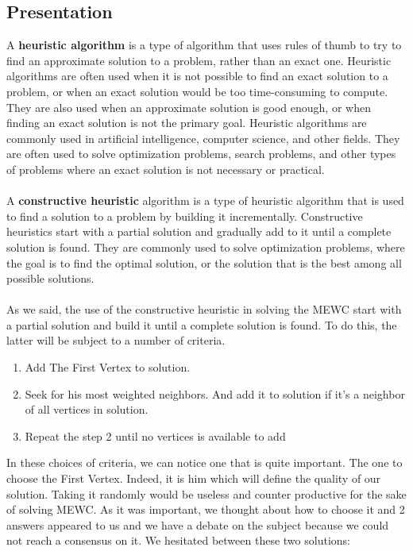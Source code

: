 
\subsection{Presentation}

    A \textbf{heuristic algorithm} is a type of algorithm that uses rules of thumb to try to find an approximate solution to a problem, rather than an exact one. Heuristic algorithms are often used when it is not possible to find an exact solution to a problem, or when an exact solution would be too time-consuming to compute. They are also used when an approximate solution is good enough, or when finding an exact solution is not the primary goal. Heuristic algorithms are commonly used in artificial intelligence, computer science, and other fields. They are often used to solve optimization problems, search problems, and other types of problems where an exact solution is not necessary or practical.
    \\ \\
    A \textbf{constructive heuristic} algorithm is a type of heuristic algorithm that is used to find a solution to a problem by building it incrementally. Constructive heuristics start with a partial solution and gradually add to it until a complete solution is found. They are commonly used to solve optimization problems, where the goal is to find the optimal solution, or the solution that is the best among all possible solutions.
    \\ \\
    As we said, the use of the constructive heuristic in solving the MEWC start with a partial solution and build it until a complete solution is found. To do this, the latter will be subject to a number of criteria. 

    \begin{enumerate}
        \item Add The First Vertex to solution.
        \item Seek for his most weighted neighbors. And add it to solution if it's a neighbor of all vertices in solution.
        \item Repeat the step 2 until no vertices is available to add
    \end{enumerate}

    In these choices of criteria, we can notice one that is quite important. The one to choose the First Vertex. Indeed, it is him which will define the quality of our solution. Taking it randomly would be useless and counter productive for the sake of solving MEWC. As it was important, we thought about how to choose it and 2 answers appeared to us and we have a debate on the subject because we could not reach a consensus on it. We hesitated between these two solutions:

